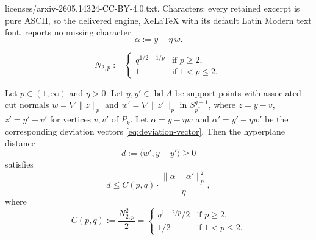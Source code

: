 \documentclass[10pt,a4paper]{amsart}
\newcommand{\pstar}{p^*}
\begin{document}
licenses/arxiv-2605.14324-CC-BY-4.0.txt. Characters: every retained excerpt is pure ASCII, so the delivered engine, XeLaTeX with its default Latin Modern text font, reports no missing character.
\begin{equation}\label{eq:deviation-vector}
\alpha := y - \eta \, w.
\end{equation}

\begin{equation}\label{eq:norm-equiv}
N_{2,p} := \begin{cases} q^{1/2 - 1/p} & \text{if } p \ge 2, \\ 1 & \text{if } 1 < p \le 2, \end{cases}
\end{equation}

\begin{lemma}\label{lem:hyperplane-distance}
Let $p \in (1, \infty)$ and $\eta > 0$. Let $y, y' \in \operatorname{bd} A$ be support points with associated cut normals $w = \nabla\|z\|_p$ and $w' = \nabla\|z'\|_p$ in $S_{\pstar}^{q-1}$, where $z = y - v$, $z' = y' - v'$ for vertices $v, v'$ of $P_k$. Let $\alpha = y - \eta w$ and $\alpha' = y' - \eta w'$ be the corresponding deviation vectors \eqref{eq:deviation-vector}. Then the hyperplane distance
\[
d := \langle w', y - y' \rangle \ge 0
\]
satisfies
\begin{equation}\label{eq:hyperplane-distance}
d \le C(p,q) \cdot \frac{\|\alpha - \alpha'\|_p^2}{\eta},
\end{equation}
where
\[
C(p,q) := \frac{N_{2,p}^2}{2} = \begin{cases} q^{1-2/p}/2 & \text{if } p \ge 2, \\[4pt] 1/2 & \text{if } 1 < p \le 2. \end{cases}
\]
\end{lemma}
\end{document}
